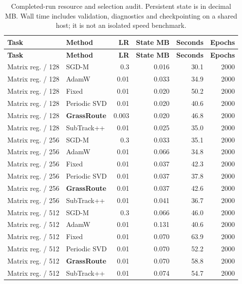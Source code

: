 {\scriptsize\setlength{\tabcolsep}{3pt}
\begin{longtable}{llrrrr}
\caption{Completed-run resource and selection audit. Persistent state is in decimal MB. Wall time includes validation, diagnostics and checkpointing on a shared host; it is not an isolated speed benchmark.}\\
\toprule {\bfseries Task} & {\bfseries Method} & {\bfseries LR} & {\bfseries State MB} & {\bfseries Seconds} & {\bfseries Epochs}\\ \midrule\endfirsthead
\toprule {\bfseries Task} & {\bfseries Method} & {\bfseries LR} & {\bfseries State MB} & {\bfseries Seconds} & {\bfseries Epochs}\\ \midrule\endhead
Matrix reg. / 128 & SGD-M & 0.3 & 0.016 & 30.1 & 2000 \\
Matrix reg. / 128 & AdamW & 0.01 & 0.033 & 34.9 & 2000 \\
Matrix reg. / 128 & Fixed & 0.01 & 0.020 & 50.2 & 2000 \\
Matrix reg. / 128 & Periodic SVD & 0.01 & 0.020 & 40.6 & 2000 \\
\rowcolor{oursbg}Matrix reg. / 128 & \textbf{GrassRoute} & 0.003 & 0.020 & 46.8 & 2000 \\
Matrix reg. / 128 & SubTrack++ & 0.01 & 0.025 & 35.0 & 2000 \\
Matrix reg. / 256 & SGD-M & 0.3 & 0.033 & 35.1 & 2000 \\
Matrix reg. / 256 & AdamW & 0.01 & 0.066 & 34.8 & 2000 \\
Matrix reg. / 256 & Fixed & 0.01 & 0.037 & 42.3 & 2000 \\
Matrix reg. / 256 & Periodic SVD & 0.01 & 0.037 & 37.8 & 2000 \\
\rowcolor{oursbg}Matrix reg. / 256 & \textbf{GrassRoute} & 0.01 & 0.037 & 42.6 & 2000 \\
Matrix reg. / 256 & SubTrack++ & 0.01 & 0.041 & 36.7 & 2000 \\
Matrix reg. / 512 & SGD-M & 0.3 & 0.066 & 46.0 & 2000 \\
Matrix reg. / 512 & AdamW & 0.01 & 0.131 & 40.6 & 2000 \\
Matrix reg. / 512 & Fixed & 0.01 & 0.070 & 63.9 & 2000 \\
Matrix reg. / 512 & Periodic SVD & 0.01 & 0.070 & 52.2 & 2000 \\
\rowcolor{oursbg}Matrix reg. / 512 & \textbf{GrassRoute} & 0.01 & 0.070 & 58.8 & 2000 \\
Matrix reg. / 512 & SubTrack++ & 0.01 & 0.074 & 54.7 & 2000 \\

\end{longtable}}
